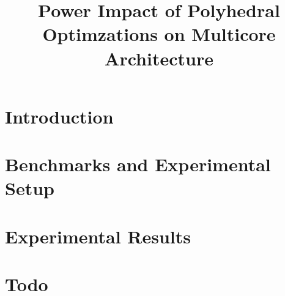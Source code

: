 \documentclass[10pt,conference,letterpaper]{IEEEtran}
\title{Power Impact of Polyhedral Optimzations on Multicore Architecture}
\begin{document}
\maketitle

%

\section{Introduction}
\label{sec:intro}


\section{Benchmarks and Experimental Setup}
\label{sec:benchmarks}

\label{sec:setup}


\section{Experimental Results}
\label{sec:results}


%

\section {Todo}
\label{sec:conclusion}






\end{document}
